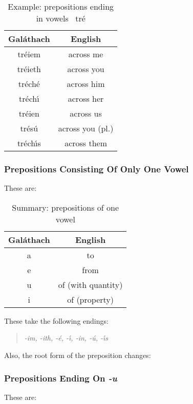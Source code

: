 \begin{table}[H]
\centering
\begin{tabu}{c|c}
  \textbf{Gal\'{a}thach} & \textbf{English}\\
  \toprule
  tr\'{e}iem & across me\\
  tr\'{e}ieth & across you\\
  tr\'{e}ch\'{e} & across him\\
  tr\'{e}ch\'{\i} & across her\\
  tr\'{e}ien & across us\\
  tr\'{e}s\'{u} & across you (pl.)\\
  tr\'{e}ch\'{\i}s & across them
\end{tabu}
\caption{Example: prepositions ending in vowels \textendash\ tr\'{e}}
\label{example_prepositions_ending_in_vowels_tre}
\end{table}

\subsubsection{Prepositions Consisting Of Only One Vowel}

These are:
\begin{table}[H]
\centering
\begin{tabu}{c|c}
  \textbf{Gal\'{a}thach} & \textbf{English}\\
  \toprule
  a & to\\
  e & from\\
  u & of (with quantity)\\
  i & of (property)
\end{tabu}
\caption{Summary: prepositions of one vowel}
\label{summary_prepositions_of_one_vowel}
\end{table}

These take the following endings:
\begin{quote}
\textit{-im, -ith, -\'{e}, -\'{\i}, -in, -\'{u}, -\'{\i}s}
\end{quote}

Also, the root form of the preposition changes:

\subsubsection{Prepositions Ending On \textit{-u}}
These are:

